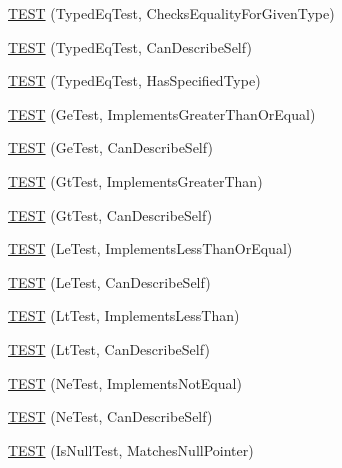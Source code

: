 \begin{DoxyCompactItemize}
\mbox{\hyperlink{namespacetesting_1_1gmock__matchers__test_a3e8d6cc259c1410a85572bc773bb21b9}{T\+E\+ST}} (Typed\+Eq\+Test, Checks\+Equality\+For\+Given\+Type)
\item 
\mbox{\hyperlink{namespacetesting_1_1gmock__matchers__test_a9baf261536023ac58ed65cdafcaf1602}{T\+E\+ST}} (Typed\+Eq\+Test, Can\+Describe\+Self)
\item 
\mbox{\hyperlink{namespacetesting_1_1gmock__matchers__test_ae0255a5de2ef537512379c3f8ff9e34f}{T\+E\+ST}} (Typed\+Eq\+Test, Has\+Specified\+Type)
\item 
\mbox{\hyperlink{namespacetesting_1_1gmock__matchers__test_a7d73fdbbee36ccf241ec6e328175655b}{T\+E\+ST}} (Ge\+Test, Implements\+Greater\+Than\+Or\+Equal)
\item 
\mbox{\hyperlink{namespacetesting_1_1gmock__matchers__test_a2718c8d5456b62ab7b060b2723939a72}{T\+E\+ST}} (Ge\+Test, Can\+Describe\+Self)
\item 
\mbox{\hyperlink{namespacetesting_1_1gmock__matchers__test_a87a9ac189a12e0b85964f03b3b9998b1}{T\+E\+ST}} (Gt\+Test, Implements\+Greater\+Than)
\item 
\mbox{\hyperlink{namespacetesting_1_1gmock__matchers__test_a2981bbdbf9cbd8864a6dde4ff4b06050}{T\+E\+ST}} (Gt\+Test, Can\+Describe\+Self)
\item 
\mbox{\hyperlink{namespacetesting_1_1gmock__matchers__test_af0cd1cfc3ff1272bfe06f31c5eb3ab8b}{T\+E\+ST}} (Le\+Test, Implements\+Less\+Than\+Or\+Equal)
\item 
\mbox{\hyperlink{namespacetesting_1_1gmock__matchers__test_a463bc4f6cdca489c05ad691e1254e2f3}{T\+E\+ST}} (Le\+Test, Can\+Describe\+Self)
\item 
\mbox{\hyperlink{namespacetesting_1_1gmock__matchers__test_a9f332401730e637d5c3923924dc339e3}{T\+E\+ST}} (Lt\+Test, Implements\+Less\+Than)
\item 
\mbox{\hyperlink{namespacetesting_1_1gmock__matchers__test_ae29bb32c74970fc22e7ac5d86e7e6c26}{T\+E\+ST}} (Lt\+Test, Can\+Describe\+Self)
\item 
\mbox{\hyperlink{namespacetesting_1_1gmock__matchers__test_a7319f919e57cf349f733bbdb56177daf}{T\+E\+ST}} (Ne\+Test, Implements\+Not\+Equal)
\item 
\mbox{\hyperlink{namespacetesting_1_1gmock__matchers__test_a8a743510a5256803d75c2d7735ec515a}{T\+E\+ST}} (Ne\+Test, Can\+Describe\+Self)
\item 
\mbox{\hyperlink{namespacetesting_1_1gmock__matchers__test_ae1c2971c161e051bf52b86b62c51bb95}{T\+E\+ST}} (Is\+Null\+Test, Matches\+Null\+Pointer)

\end{DoxyCompactItemize}
